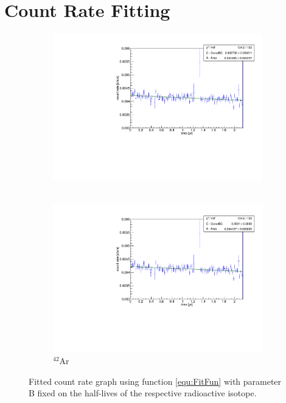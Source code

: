 \documentclass[encoding=utf8,british]{tumphthesis}
\begin{document}
\section{Count Rate Fitting}
\begin{figure}[t!]
	\centering
	\begin{subfigure}[t]{.475\textwidth}
		\centering
		\includegraphics[width=\textwidth]{./Bilder/eventRateFit.pdf}
		\caption{ \Kr\ }
		\label{fig:eventRateFit}
	\end{subfigure}\hfill%
	\begin{subfigure}[t]{.475\textwidth}
		\centering
		\includegraphics[width=\textwidth]{./Bilder/Argon.pdf}
		\caption{
		$^{42}$Ar
		}
		\label{fig:Argon}
	\end{subfigure}
	\caption{Fitted count rate graph using function \ref{equ:FitFun} with parameter B fixed on the half-lives of the respective radioactive isotope.}
		\label{fig:fit2}
		\vspace{5mm}
\end{figure}
\end{document}
